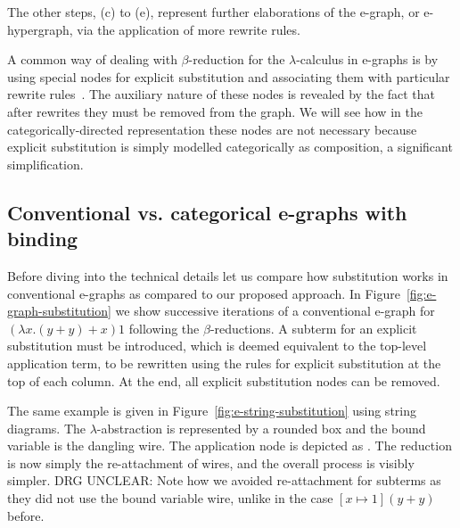 \documentclass[peerreviewcls]{IEEEtran}
\begin{document}
The other steps, (c) to (e), represent further elaborations of the e-graph, or e-hypergraph, via the application of more rewrite rules.

A common way of dealing with $\beta$-reduction for the $\lambda$-calculus in e-graphs is by using special nodes for explicit substitution and associating them with particular rewrite rules~\cite{EggPaper,koehler2022sketchguided}.
The auxiliary nature of these nodes is revealed by the fact that after rewrites they must be removed from the graph. 
We will see how in the categorically-directed representation these nodes are not necessary because explicit substitution is simply modelled categorically as composition, a significant simplification.

\subsection{Conventional vs. categorical e-graphs with binding}

Before diving into the technical details let us compare how substitution works in conventional e-graphs as compared to our proposed approach.
In Figure~\ref{fig:e-graph-substitution} we show successive iterations of a conventional e-graph for $(\lambda x . (y + y) + x) 1$ following the $\beta$-reductions.
A subterm for an explicit substitution must be introduced, which is deemed equivalent to the top-level application term, to be rewritten using the rules for explicit substitution at the top of each column.
At the end, all explicit substitution nodes can be removed.

The same example is given in Figure~\ref{fig:e-string-substitution} using string diagrams. 
The $\lambda$-abstraction is represented by a rounded box and the bound variable is the dangling wire.
The application node is depicted as 
. 
The reduction is now simply the re-attachment of wires, and the overall process is visibly simpler. 
DRG UNCLEAR: Note how we avoided re-attachment for subterms as they did not use the bound variable wire, unlike in the case $[x \mapsto 1](y+y)$ before.
\end{document}
